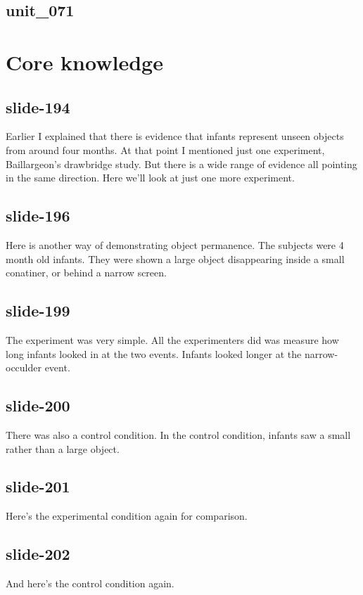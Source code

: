 \documentclass[12pt,\papersize]{extarticle}
\begin{document}
 
\subsection{unit\_071}
 
\section{Core knowledge}
 
 
\subsection{slide-194}
Earlier I explained that there is evidence that infants represent unseen objects from around four months.
At that point I mentioned just one experiment, Baillargeon's drawbridge study.
But there is a wide range of evidence all pointing in the same direction.
Here we'll look at just one more experiment.
 
 
\subsection{slide-196}
Here is another way of demonstrating object permanence.
The subjects were 4 month old infants.
They were shown a large object disappearing inside a small conatiner, or behind a narrow screen.
 
 
\subsection{slide-199}
The experiment was very simple.
All the experimenters did was measure how long infants looked in at the two events.
Infants looked longer at the narrow-occulder event.
 
 
\subsection{slide-200}
There was also a control condition.
In the control condition, infants saw a small rather than a large object.
 
 
\subsection{slide-201}
Here's the experimental condition again for comparison.
 
 
\subsection{slide-202}
And here's the control condition again.
 
\end{document}
